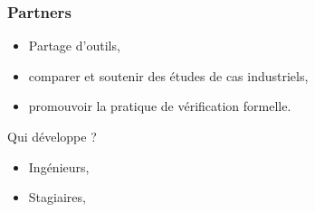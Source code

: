 \documentclass[t, english]{beamer}
\begin{document}
\begin{frame}[c]
  \frametitle{Partners}
  \begin{minipage}{.25\textwidth}
  \centering
  \end{minipage}
  
  \begin{minipage}{.7\textwidth}
     \begin{itemize}
     \item Partage d'outils,
     \item comparer et soutenir des études de cas industriels,
     \item promouvoir la pratique de vérification formelle.
     \end{itemize}
  \end{minipage}
 \end{frame}
  
\begin{frame}[plain,c]
\centering
{\Huge\LobsterTwo Qui développe ?}
\begin{center}
\begin{itemize}
     \item Ingénieurs,
     \item Stagiaires,
\end{itemize}
\end{center}
\end{frame}
\end{document}
